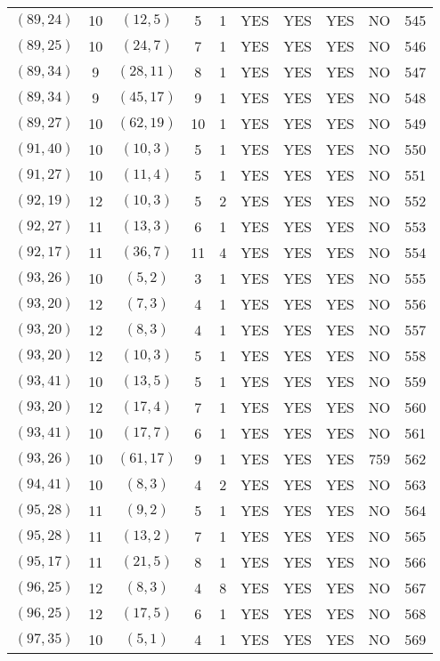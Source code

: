 \begin{longtable}{|c|c|c|c|c|c|c|c|c|c|}
$(89, 24)$ & 10 & $(12, 5)$ & 5 & 1 & YES & YES & YES & NO & 545\\
$(89, 25)$ & 10 & $(24, 7)$ & 7 & 1 & YES & YES & YES & NO & 546\\
$(89, 34)$ & 9 & $(28, 11)$ & 8 & 1 & YES & YES & YES & NO & 547\\
$(89, 34)$ & 9 & $(45, 17)$ & 9 & 1 & YES & YES & YES & NO & 548\\
$(89, 27)$ & 10 & $(62, 19)$ & 10 & 1 & YES & YES & YES & NO & 549\\
$(91, 40)$ & 10 & $(10, 3)$ & 5 & 1 & YES & YES & YES & NO & 550\\
$(91, 27)$ & 10 & $(11, 4)$ & 5 & 1 & YES & YES & YES & NO & 551\\
$(92, 19)$ & 12 & $(10, 3)$ & 5 & 2 & YES & YES & YES & NO & 552\\
$(92, 27)$ & 11 & $(13, 3)$ & 6 & 1 & YES & YES & YES & NO & 553\\
$(92, 17)$ & 11 & $(36, 7)$ & 11 & 4 & YES & YES & YES & NO & 554\\
$(93, 26)$ & 10 & $(5, 2)$ & 3 & 1 & YES & YES & YES & NO & 555\\
$(93, 20)$ & 12 & $(7, 3)$ & 4 & 1 & YES & YES & YES & NO & 556\\
$(93, 20)$ & 12 & $(8, 3)$ & 4 & 1 & YES & YES & YES & NO & 557\\
$(93, 20)$ & 12 & $(10, 3)$ & 5 & 1 & YES & YES & YES & NO & 558\\
$(93, 41)$ & 10 & $(13, 5)$ & 5 & 1 & YES & YES & YES & NO & 559\\
$(93, 20)$ & 12 & $(17, 4)$ & 7 & 1 & YES & YES & YES & NO & 560\\
$(93, 41)$ & 10 & $(17, 7)$ & 6 & 1 & YES & YES & YES & NO & 561\\
$(93, 26)$ & 10 & $(61, 17)$ & 9 & 1 & YES & YES & YES & 759 & 562\\
$(94, 41)$ & 10 & $(8, 3)$ & 4 & 2 & YES & YES & YES & NO & 563\\
$(95, 28)$ & 11 & $(9, 2)$ & 5 & 1 & YES & YES & YES & NO & 564\\
$(95, 28)$ & 11 & $(13, 2)$ & 7 & 1 & YES & YES & YES & NO & 565\\
$(95, 17)$ & 11 & $(21, 5)$ & 8 & 1 & YES & YES & YES & NO & 566\\
$(96, 25)$ & 12 & $(8, 3)$ & 4 & 8 & YES & YES & YES & NO & 567\\
$(96, 25)$ & 12 & $(17, 5)$ & 6 & 1 & YES & YES & YES & NO & 568\\
$(97, 35)$ & 10 & $(5, 1)$ & 4 & 1 & YES & YES & YES & NO & 569\\

\end{longtable}
